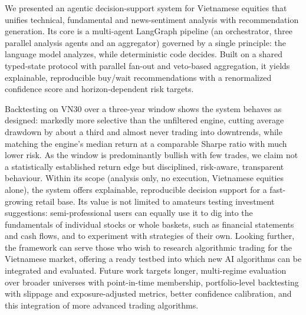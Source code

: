 \documentclass[runningheads]{llncs}
\begin{document}
We presented an agentic decision-support system for Vietnamese equities that
unifies technical, fundamental and news-sentiment analysis with recommendation
generation. Its core is a multi-agent LangGraph pipeline (an orchestrator, three
parallel analysis agents and an aggregator) governed by a single principle: the
language model analyzes, while deterministic code decides. Built on a shared
typed-state protocol with parallel fan-out and veto-based aggregation, it yields
explainable, reproducible buy/wait recommendations with a renormalized confidence
score and horizon-dependent risk targets.

Backtesting on VN30 over a three-year window shows the system behaves as
designed: markedly more selective than the unfiltered engine, cutting average
drawdown by about a third and almost never trading into downtrends, while matching
the engine's median return at a comparable Sharpe ratio with much lower risk. As
the window is predominantly bullish with few trades, we claim not a statistically
established return edge but disciplined, risk-aware, transparent behaviour. Within its scope (analysis only, no execution, Vietnamese equities
alone), the system offers explainable, reproducible decision support for a
fast-growing retail base. Its value is not limited to amateurs testing investment
suggestions: semi-professional users can equally use it to dig into the
fundamentals of individual stocks or whole baskets, such as financial statements
and cash flows, and to experiment with strategies of their own. Looking further,
the framework can serve those who wish to research algorithmic trading for the
Vietnamese market, offering a ready testbed into which new AI algorithms can be
integrated and evaluated. Future work targets longer, multi-regime evaluation over
broader universes with point-in-time membership, portfolio-level backtesting with
slippage and exposure-adjusted metrics, better confidence calibration, and this
integration of more advanced trading algorithms.
\end{document}
